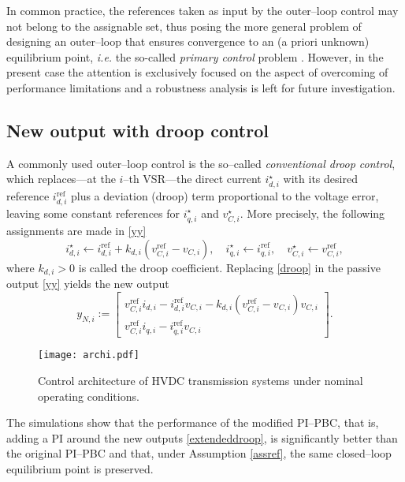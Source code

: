 \documentclass[5p,twocolumn]{elsarticle}
\def\lef[{\left[\begin{array}}
\def\rig]{\end{array}\right]}
\numberwithin{equation}{section}
\begin{document}
In common practice, the references taken as input by the outer--loop control may not belong to the assignable set, thus posing the more general problem of designing an outer--loop that ensures convergence to an (a priori unknown) equilibrium point, \textit{i.e.} the so-called \textit{primary control} problem \cite{berteen,dorfler,sandberg}. However, in the present case the attention is exclusively focused on the aspect of overcoming of performance limitations and  a robustness analysis is left for future investigation.




\subsection{New output with droop control}
A commonly used outer--loop control is the so--called {\em conventional droop control}, which replaces---at the $i$--th VSR---the direct current $i_{d,i}^\star $ with its desired reference $i_{d,i}^{\mathrm{ref}}$ plus a deviation (droop) term proportional to the voltage error, leaving some constant references for  $i_{q,i}^\star $ and  $v_{C,i}^\star $. More precisely, the following assignments are made in  \eqref{yy}
\begin{equation}
\label{droop}
i_{d,i}^\star  \leftarrow i_{d,i}^{\mathrm{\mathrm{ref}}}+k_{d,i}(v_{C,i}^{\mathrm{ref}}-v_{C,i}),\quad i_{q,i}^\star  \leftarrow i_{q,i}^{\mathrm{ref}},\quad v_{C,i}^\star \leftarrow v_{C,i}^{\mathrm{ref}},
\end{equation}
where $k_{d,i}>0$ is called the droop coefficient. 
Replacing \eqref{droop} in the passive output \eqref{yy} yields the new output
\begin{equation}
\label{extendeddroop}
y_{N,i}:=\lef[{c} v_{C,i}^{\mathrm{ref}}i_{d,i}-i_{d,i}^{\mathrm{ref}}v_{C,i}-k_{d,i}(v_{C,i}^{\mathrm{ref}}-v_{C,i})v_{C,i}\\ v_{C,i}^{\mathrm{ref}}i_{q,i}-i_{q,i}^{\mathrm{ref}}v_{C,i}\rig].
\end{equation}

\begin{figure*}[ht]
 \centering
 \texttt{[image: archi.pdf]}
\caption{{Control architecture of HVDC transmission systems under nominal operating conditions.}}
 \label{droopfg}
\end{figure*}
The simulations show that the performance of the modified PI--PBC, that is, adding a PI around the new outputs \eqref{extendeddroop}, is significantly better than the original PI--PBC and that, under Assumption \ref{assref}, the same closed--loop equilibrium point is preserved. 
\end{document}
